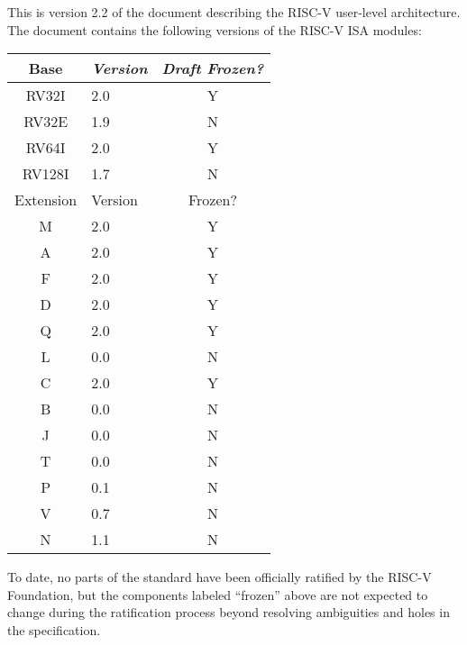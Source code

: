 This is version 2.2 of the document describing the RISC-V
user-level architecture.  The document contains the following
versions of the RISC-V ISA modules:
\begin{table}[hbt]
  \centering
  \begin{tabular}{|c|l|c|}
    \hline
    Base     & \em Version & \em Draft Frozen? \\
    \hline
    RV32I    & 2.0 & Y \\
    RV32E    & 1.9 & N \\
    RV64I    & 2.0 & Y \\
    RV128I   & 1.7 & N \\
    \hline
    Extension & Version & Frozen? \\
    \hline
    M        & 2.0 & Y \\
    A        & 2.0 & Y \\
    F        & 2.0 & Y \\
    D        & 2.0 & Y \\
    Q        & 2.0 & Y \\
    L        & 0.0 & N \\
    C        & 2.0 & Y \\
    B        & 0.0 & N \\
    J        & 0.0 & N \\
    T        & 0.0 & N \\
    P        & 0.1 & N \\
    V        & 0.7 & N \\
    N        & 1.1 & N \\
    \hline
  \end{tabular}
\end{table}

To date, no parts of the standard have been officially ratified by the
RISC-V Foundation, but the components labeled ``frozen'' above are not
expected to change during the ratification process beyond resolving
ambiguities and holes in the specification.


